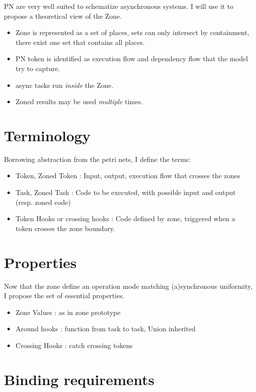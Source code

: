 PN are very well suited to schematize asynchronous systems. I will use it to propose a theoretical view of the Zone.

\begin{itemize}
\item Zone is represented as a set of places, sets can only intersect by containment, there exist one set that contains all places.
\item PN token is identified as execution flow and dependency flow that the model try to capture.
\item async tasks run \emph{inside} the Zone.
\item Zoned results may be used \emph{multiple} times.
\end{itemize}

\section{Terminology}

Borrowing abstraction from the petri nets, I define the terms:

\begin{itemize}
\item Token, Zoned Token : Input, output, execution flow that crosses the zones
\item Task, Zoned Task : Code to be executed, with possible input and output (resp. zoned code)
\item Token Hooks or crossing hooks : Code defined by zone, triggered when a token crosses the zone boundary.
\end{itemize}

\section{Properties}

Now that the zone define an operation mode matching (a)synchronous uniformity, I propose the set of essential properties.

\begin{itemize}
\item Zone Values : as in zone prototype
\item Around hooks : function from task to task, Union inherited
\item Crossing Hooks : catch crossing tokens
\end{itemize}

\section{Binding requirements}

